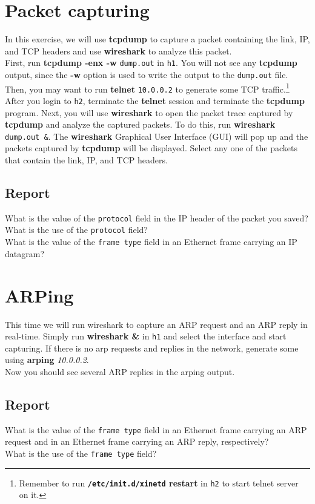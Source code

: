 \documentclass[10pt,a4paper]{article}
\numberwithin{equation}{section}
\numberwithin{figure}{section}
\numberwithin{table}{section}
\begin{document}
    \section{Packet capturing}
    In this exercise, we will use \textbf{tcpdump} to capture a packet containing the link, IP, and TCP headers and use \textbf{wireshark} to analyze this packet. \\
    First, run \textbf{tcpdump -enx -w} \texttt{dump.out} in \texttt{h1}.
    You will not see any \textbf{tcpdump} output, since the \textbf{-w} option is used to write the output to the \texttt{dump.out} file. \\
    Then, you may want to run \textbf{telnet} \texttt{10.0.0.2} to generate some TCP traffic.\footnote{Remember to run \textbf{\texttt{/etc/init.d/xinetd} restart} in \texttt{h2} to start telnet server on it.}
    After you login to \texttt{h2}, terminate the \textbf{telnet} session and terminate the \textbf{tcpdump} program.
    Next, you will use \textbf{wireshark} to open the packet trace captured by \textbf{tcpdump} and analyze the captured packets.
    To do this, run \textbf{wireshark} \texttt{dump.out \&}.
    The \textbf{wireshark} Graphical User Interface (GUI) will pop up and the packets captured by \textbf{tcpdump} will be displayed.
    Select any one of the packets that contain the link, IP, and TCP headers.
    \subsection*{Report}
    What is the value of the \texttt{protocol} field in the IP header of the packet you saved?
    What is the use of the \texttt{protocol} field? \\
    What is the value of the \texttt{frame type} field in an Ethernet frame carrying an IP datagram?


    \section{ARPing}
    This time we will run wireshark to capture an ARP request and an ARP reply in real-time. Simply run \textbf{wireshark \&} in \texttt{h1} and select the interface and start capturing.
    If there is no arp requests and replies in the network, generate some using \textbf{arping} \textit{10.0.0.2}. \\
    Now you should see several ARP replies in the arping output.
    \subsection*{Report}
    What is the value of the \texttt{frame type} field in an Ethernet frame carrying an ARP request and in an Ethernet frame carrying an ARP reply, respectively? \\
    What is the use of the \texttt{frame type} field? \\
\end{document}
